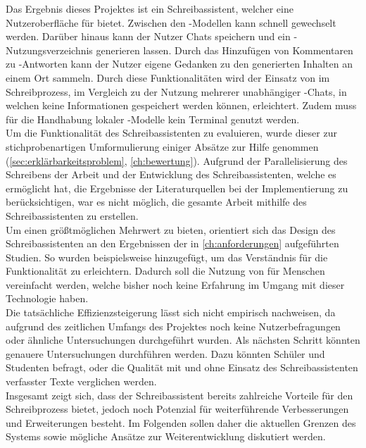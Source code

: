 \documentclass[../main.tex]{subfiles}
\begin{document}
Das Ergebnis dieses Projektes ist ein Schreibassistent, welcher eine Nutzeroberfläche für  bietet.
Zwischen den -Modellen kann schnell gewechselt werden. Darüber hinaus kann der Nutzer Chats speichern und ein -Nutzungsverzeichnis generieren lassen. Durch das Hinzufügen von Kommentaren 
zu -Antworten kann der Nutzer eigene Gedanken zu den generierten Inhalten an einem Ort sammeln. Durch diese Funktionalitäten wird der Einsatz von  im Schreibprozess, im Vergleich 
zu der Nutzung mehrerer unabhängiger -Chats, in welchen keine Informationen gespeichert werden können, erleichtert. Zudem muss für die Handhabung lokaler -Modelle kein Terminal genutzt werden. \\ 
Um die Funktionalität des Schreibassistenten zu evaluieren, wurde dieser zur stichprobenartigen Umformulierung einiger Absätze zur Hilfe genommen (\autoref{sec:erklärbarkeitsproblem}, \autoref{ch:bewertung}). Aufgrund der Parallelisierung des Schreibens der Arbeit und der Entwicklung des Schreibassistenten, welche es ermöglicht hat, die Ergebnisse der Literaturquellen bei der 
Implementierung zu berücksichtigen, war es nicht möglich, die gesamte Arbeit mithilfe des Schreibassistenten zu erstellen. \\
Um einen größtmöglichen Mehrwert zu bieten, orientiert sich das Design des Schreibassistenten an den Ergebnissen der in \autoref{ch:anforderungen} aufgeführten Studien. So wurden beispielsweise 
 hinzugefügt, um das Verständnis für die Funktionalität zu erleichtern. Dadurch soll die Nutzung von  für Menschen vereinfacht werden, welche bisher noch keine Erfahrung im 
Umgang mit dieser Technologie haben.\\
Die tatsächliche Effizienzsteigerung lässt sich nicht empirisch nachweisen, da aufgrund des zeitlichen Umfangs des Projektes noch keine Nutzerbefragungen oder ähnliche Untersuchungen durchgeführt 
wurden. Als nächsten Schritt könnten genauere Untersuchungen durchführen werden. Dazu könnten Schüler und Studenten befragt, oder die Qualität mit und ohne 
Einsatz des Schreibassistenten verfasster Texte verglichen werden.\\ 
Insgesamt zeigt sich, dass der Schreibassistent bereits zahlreiche Vorteile für den Schreibprozess bietet, jedoch noch Potenzial für weiterführende Verbesserungen und Erweiterungen 
besteht. Im Folgenden sollen daher die aktuellen Grenzen des Systems sowie mögliche Ansätze zur Weiterentwicklung diskutiert werden.\\
\end{document}
